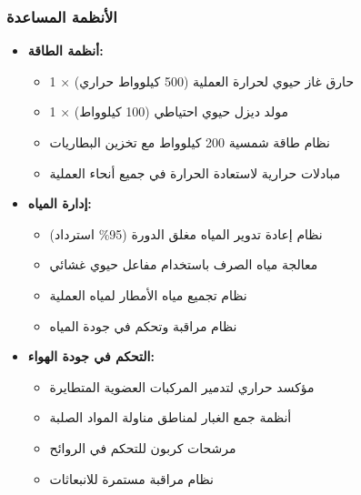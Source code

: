 \subsubsection{الأنظمة المساعدة}
\begin{itemize}
    \item \textbf{أنظمة الطاقة:}
    \begin{itemize}
        \item 1 × حارق غاز حيوي لحرارة العملية (500 كيلوواط حراري)
        \item 1 × مولد ديزل حيوي احتياطي (100 كيلوواط)
        \item نظام طاقة شمسية 200 كيلوواط مع تخزين البطاريات
        \item مبادلات حرارية لاستعادة الحرارة في جميع أنحاء العملية
    \end{itemize}
    
    \item \textbf{إدارة المياه:}
    \begin{itemize}
        \item نظام إعادة تدوير المياه مغلق الدورة (95\% استرداد)
        \item معالجة مياه الصرف باستخدام مفاعل حيوي غشائي
        \item نظام تجميع مياه الأمطار لمياه العملية
        \item نظام مراقبة وتحكم في جودة المياه
    \end{itemize}
    
    \item \textbf{التحكم في جودة الهواء:}
    \begin{itemize}
        \item مؤكسد حراري لتدمير المركبات العضوية المتطايرة
        \item أنظمة جمع الغبار لمناطق مناولة المواد الصلبة
        \item مرشحات كربون للتحكم في الروائح
        \item نظام مراقبة مستمرة للانبعاثات
    \end{itemize}
\end{itemize}
